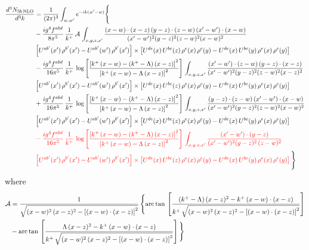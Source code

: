 \documentclass[9pt]{article}
\newcommand{\rc}{\color{red}}
\numberwithin{equation}{section}
\begin{document}
\begin{align}
\frac{d^{3}N_{3b\,\rm NLO}}{d^{3}k} & =\frac{1}{(2\pi)^{3}}\int_{w,w'}e^{-ik(w'-w)}\Bigg\{\notag \\ &-\frac{ig^{4}f^{abd}}{8\pi^{5}}\,\frac{1}{k^{+}}\,\mathcal{A}\,\int_{x,y,z,x'}
\frac{(x-w)\cdot(x-z)\,(y-z)\cdot(z-w)\,(x'-w')\cdot(x-w)}{(x'-w')^{2}(y-z)^{2}(z-w)^{2}(x-w)^{2}}\notag \\ & \left[U^{ab'}(x')\,\rho^{b'}(x')-U^{ab'}(w')\, \rho^{b'}(x')\right]\times \left[U^{de}(x)\,U^{bc}(z)\, \rho^{e}(x)\,\rho^{c}(y)-U^{de}(x)\,U^{bc}(y)\,\rho^{e}(x)\,\rho^{c}(y)\right]\notag \\ & -\frac{ig^{4}f^{abd}}{16\pi^{5}}\,\frac{1}{k^{+}}\,\log{\left[\frac{\left[k^{+}\,(x-w)-(k^{+}-\Lambda)\,(x-z)\right]^{2}}{\left[k^{+}\,(x-w)-\Lambda\,(x-z)\right]^{2}}\right]}\,\int_{x,y,z,x'}
\frac{(x'-w')\cdot(z-w)\,(y-z)\cdot(x-z)}{(x'-w')^{2}(y-z)^{2}(z-w)^{2}(x-z)^{2}}\notag \\
&\left[U^{ab'}(x')\,\rho^{b'}(x')-U^{ab'}(w')\, \rho^{b'}(x')\right]\times \left[U^{de}(x)\,U^{bc}(z)\, \rho^{e}(x)\,\rho^{c}(y)-U^{de}(x)\,U^{bc}(y)\,\rho^{e}(x)\,\rho^{c}(y)\right]\notag \\ &+ \frac{ig^{4}f^{abd}}{16\pi^{5}}\,\frac{1}{k^{+}}\,\log{\left[\frac{\left[k^{+}\,(x-w)-(k^{+}-\Lambda)\,(x-z)\right]^{2}}{\left[k^{+}\,(x-w)-\Lambda\,(x-z)\right]^{2}}\right]}\,\int_{x,y,z,x'}
\frac{(y-z)\cdot(z-w)\,(x'-w')\cdot(x-w)}{(x'-w')^{2}(y-z)^{2}(z-w)^{2}(x-w)^{2}}\notag \\ 
& \left[U^{ab'}(x')\,\rho^{b'}(x')-U^{ab'}(w')\, \rho^{b'}(x')\right]\times \left[U^{de}(x)\,U^{bc}(z)\, \rho^{e}(x)\,\rho^{c}(y)-U^{de}(x)\,U^{bc}(y)\,\rho^{e}(x)\,\rho^{c}(y)\right]\notag \\ & \rc -\frac{ig^{4}f^{abd}}{16\pi^{5}}\,\frac{1}{k^{+}}\,\log{\left[\frac{\left[k^{+}\,(x-w)-(k^{+}-\Lambda)\,(x-z)\right]^{2}}{\left[k^{+}\,(x-w)-\Lambda\,(x-z)\right]^{2}}\right]}\,\int_{x,y,z,x'}
\frac{(x'-w')\cdot(y-z)}{(x'-w')^{2}(y-z)^{2}\,(z-w)^{2}}\notag \\ & \rc \left[U^{ab'}(x')\,\rho^{b'}(x')-U^{ab'}(w')\, \rho^{b'}(x')\right]\times \left[U^{de}(x)\,U^{bc}(z)\, \rho^{e}(x)\,\rho^{c}(y)-U^{de}(x)\,U^{bc}(y)\,\rho^{e}(x)\,\rho^{c}(y)\right]\color{black}\Bigg\}
\end{align}
where 
\begin{align}
\mathcal{A} & = \frac{1}{\sqrt{(x-w)^{2}\,(x-z)^{2}-\left[(x-w)\cdot (x-z)\right]^{2}}}\, \Bigg\{\mathrm{arc\,tan}\,\left[\frac{(k^{+}-\Lambda)\,(x-z)^{2}-k^{+}\,(x-w)\cdot (x-z)}{k^{+}\,\sqrt{(x-w)^{2}\,(x-z)^{2}-\left[(x-w)\cdot (x-z)\right]^{2}}}\right]\notag \\ & - \mathrm{arc\,tan}\,\left[\frac{\Lambda\,(x-z)^{2}-k^{+}\,(x-w)\cdot (x-z)}{k^{+}\,\sqrt{(x-w)^{2}\,(x-z)^{2}-\left[(x-w)\cdot (x-z)\right]^{2}}}\right] \Bigg\} \nonumber
\end{align}
\end{document}
